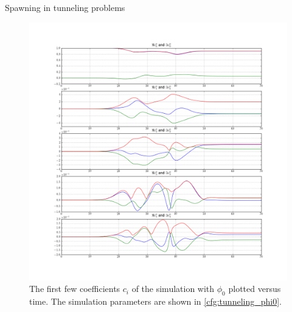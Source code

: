 \begin{chapter}{Spawning in tunneling problems}
\begin{figure}[h!]
  \centering
  \includegraphics[width=\the\linewidth]{./figures/tunnel_basic/coefficients_first_phi0.png}
  \caption[The first few coefficients $c_i$ of the simulation with $\phi_0$]
  {The first few coefficients $c_i$ of the simulation with $\phi_0$ plotted versus time.
  The simulation parameters are shown in \ref{cfg:tunneling_phi0}.}
\end{figure}


\end{chapter}

